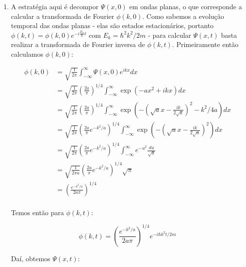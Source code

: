 \documentclass[a4paper, 12pt, notitlepage]{article}
\begin{document}
\begin{enumerate}
\begin{enumerate}
  \item A estratégia aqui é decompor $\Psi(x,0)$ em ondas planas, o que corresponde a calcular a transformada de Fourier $\phi(k, 0)$. Como sabemos a evolução temporal das ondas planas - elas são estados estacionários, portanto $\phi(k, t) = \phi(k, 0) e^{-i\frac{E_k}{\hbar} t}$ com $E_k = \hbar^2 k^2/2m$ - para calcular $\Psi(x, t)$ basta realizar a transformada de Fourier inversa de $\phi(k, t)$.
  Primeiramente então calculamos $\phi(k, 0)$:

  \begin{align*}
  \phi(k, 0) &= \sqrt{\frac{1}{2\pi}} \int_{-\infty}^{\infty} \Psi(x, 0) e^{ikx} dx \\
  &= \sqrt{\frac{1}{2\pi}} \left(\frac{2a}{\pi}\right)^{1/4} \int_{-\infty}^{\infty} \exp\left(-ax^2 + ikx\right) dx \\
  &= \sqrt{\frac{1}{2\pi}} \left(\frac{2a}{\pi}\right)^{1/4} \int_{-\infty}^{\infty} \exp\left(-\left(\sqrt{a}x - \frac{ik}{2\sqrt{a}}\right)^2 - k^2/4a\right) dx \\
  &= \sqrt{\frac{1}{2\pi}} \left(\frac{2a}{\pi} e^{-k^2/a}\right)^{1/4} \int_{-\infty}^{\infty} \exp\left(-\left(\sqrt{a}x - \frac{ik}{2\sqrt{a}}\right)^2\right) dx \\
  &= \sqrt{\frac{1}{2\pi}} \left(\frac{2a}{\pi} e^{-k^2/a}\right)^{1/4} \int_{-\infty}^{\infty} e^{-u^2} \frac{du}{\sqrt{a}} \\
  &= \sqrt{\frac{1}{2\pi a}} \left(\frac{2a}{\pi} e^{-k^2/a}\right)^{1/4} \sqrt{\pi} \\
  &= \left(\frac{e^{-k^2/a}}{2a\pi}\right)^{1/4} \\
  \end{align*}

  Temos então para $\phi(k, t)$:

  \begin{equation*}
  \phi(k, t) = \left(\frac{e^{-k^2/a}}{2a\pi}\right)^{1/4} e^{-i\hbar k ^2 t/2m} 
  \end{equation*}

  Daí, obtemos $\Psi(x,t)$:


\end{enumerate}
\end{enumerate}
\end{document}
